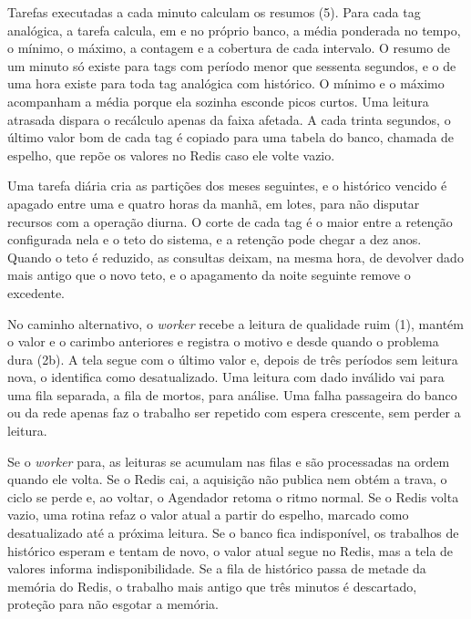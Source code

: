 \par Tarefas executadas a cada minuto calculam os resumos (5). Para cada tag analógica, a tarefa calcula, em  e no próprio banco, a média ponderada no tempo, o mínimo, o máximo, a contagem e a cobertura de cada intervalo. O resumo de um minuto só existe para tags com período menor que sessenta segundos, e o de uma hora existe para toda tag analógica com histórico. O mínimo e o máximo acompanham a média porque ela sozinha esconde picos curtos. Uma leitura atrasada dispara o recálculo apenas da faixa afetada. A cada trinta segundos, o último valor bom de cada tag é copiado para uma tabela do banco, chamada de espelho, que repõe os valores no Redis caso ele volte vazio.

\par Uma tarefa diária cria as partições dos meses seguintes, e o histórico vencido é apagado entre uma e quatro horas da manhã, em lotes, para não disputar recursos com a operação diurna. O corte de cada tag é o maior entre a retenção configurada nela e o teto do sistema, e a retenção pode chegar a dez anos. Quando o teto é reduzido, as consultas deixam, na mesma hora, de devolver dado mais antigo que o novo teto, e o apagamento da noite seguinte remove o excedente.

\par No caminho alternativo, o \emph{worker} recebe a leitura de qualidade ruim (1), mantém o valor e o carimbo anteriores e registra o motivo e desde quando o problema dura (2b). A tela segue com o último valor e, depois de três períodos sem leitura nova, o identifica como desatualizado. Uma leitura com dado inválido vai para uma fila separada, a fila de mortos, para análise. Uma falha passageira do banco ou da rede apenas faz o trabalho ser repetido com espera crescente, sem perder a leitura.

\par Se o \emph{worker} para, as leituras se acumulam nas filas e são processadas na ordem quando ele volta. Se o Redis cai, a aquisição não publica nem obtém a trava, o ciclo se perde e, ao voltar, o Agendador retoma o ritmo normal. Se o Redis volta vazio, uma rotina refaz o valor atual a partir do espelho, marcado como desatualizado até a próxima leitura. Se o banco fica indisponível, os trabalhos de histórico esperam e tentam de novo, o valor atual segue no Redis, mas a tela de valores informa indisponibilidade. Se a fila de histórico passa de metade da memória do Redis, o trabalho mais antigo que três minutos é descartado, proteção para não esgotar a memória.

